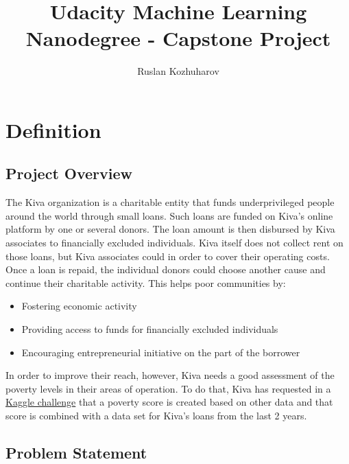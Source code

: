 \documentclass{article}
\title{Udacity Machine Learning Nanodegree - Capstone Project}
\author{Ruslan Kozhuharov}
\begin{document}
\maketitle
\tableofcontents
\newpage
{}

\section{Definition}
\subsection{Project Overview}
The Kiva organization is a charitable entity that funds underprivileged people around the world through small loans. Such loans are funded on Kiva’s online platform by one or several donors. The loan amount is then disbursed by Kiva associates to financially excluded individuals. Kiva itself does not collect rent on those loans, but Kiva associates could in order to cover their operating costs. Once a loan is repaid, the individual donors could choose another cause and continue their charitable activity. This helps poor communities by:
\begin{itemize}
  \item Fostering economic activity
  \item Providing access to funds for financially excluded individuals
  \item Encouraging entrepreneurial initiative on the part of the borrower
\end{itemize}
In order to improve their reach, however, Kiva needs a good assessment of the poverty levels in their areas of operation. To do that, Kiva has requested in a \href{https://www.kaggle.com/kiva/data-science-for-good-kiva-crowdfunding}{Kaggle challenge} that a poverty score is created based on other data and that score is combined with a data set for Kiva’s loans from the last 2 years.
\hypertarget{prob_statement}{\subsection{Problem Statement}}
\end{document}
